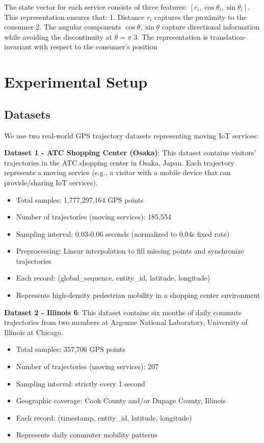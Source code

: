 \documentclass[10pt,twocolumn]{article}
\providecommand{\tightlist}{\setlength{\itemsep}{0pt}\setlength{\parskip}{0pt}}
\begin{document}
The state vector for each service consists of three features:
\([r_i, \cos\theta_i, \sin\theta_i]\). This representation ensures that:
1. Distance \(r_i\) captures the proximity to the consumer
2. The angular components \(\cos\theta, \sin\theta\) capture directional
information while avoiding the discontinuity at \(\theta = \pi\)
3. The representation is translation-invariant with respect to the
consumer's position

\section{Experimental Setup}\label{experimental-setup}

\subsection{Datasets}\label{datasets}

We use two real-world GPS trajectory datasets representing moving IoT
services:

\textbf{Dataset 1 - ATC Shopping Center (Osaka)}: This dataset contains
visitors' trajectories in the ATC shopping center in Osaka, Japan. Each
trajectory represents a moving service (e.g., a visitor with a mobile
device that can provide/sharing IoT services).

\begin{itemize}
	\tightlist
	\item
	      Total samples: 1,777,297,164 GPS points
	\item
	      Number of trajectories (moving services): 185,554
	\item
	      Sampling interval: 0.03-0.06 seconds (normalized to 0.04s fixed rate)
	\item
	      Preprocessing: Linear interpolation to fill missing points and
	      synchronize trajectories
	\item
	      Each record: (global\_sequence, entity\_id, latitude, longitude)
	\item
	      Represents high-density pedestrian mobility in a shopping center
	      environment
\end{itemize}

\textbf{Dataset 2 - Illinois 6}: This dataset contains six months of
daily commute trajectories from two members at Argonne National
Laboratory, University of Illinois at Chicago.

\begin{itemize}
	\tightlist
	\item
	      Total samples: 357,706 GPS points
	\item
	      Number of trajectories (moving services): 207
	\item
	      Sampling interval: strictly every 1 second
	\item
	      Geographic coverage: Cook County and/or Dupage County, Illinois
	\item
	      Each record: (timestamp, entity\_id, latitude, longitude)
	\item
	      Represents daily commuter mobility patterns
\end{itemize}
\end{document}
